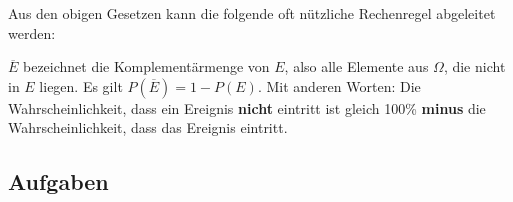 Aus den obigen Gesetzen kann die folgende oft nützliche Rechenregel abgeleitet werden:

\begin{gesetz}{}{}
 $\overline{E}$ bezeichnet die Komplementärmenge von
  $E$, also alle Elemente aus $\Omega$, die nicht in $E$ liegen. Es gilt $P(\overline{E}) = 1-P(E)$. Mit anderen Worten: Die Wahrscheinlichkeit, dass ein Ereignis \textbf{nicht} eintritt ist gleich 100\% \textbf{minus} die Wahrscheinlichkeit, dass das Ereignis eintritt.
\end{gesetz}


\subsection*{Aufgaben}

\newpage
